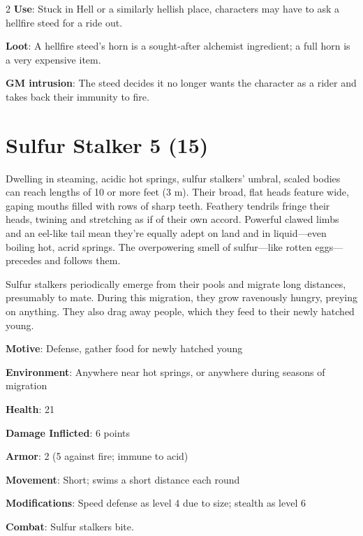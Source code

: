\begin{multicols}{2}
\textbf{Use}: Stuck in Hell or a similarly hellish place, characters may have to ask a hellfire steed for a ride out. 

\textbf{Loot}: A hellfire steed’s horn is a sought-after alchemist ingredient; a full horn is a very expensive item.

\textbf{GM intrusion}: The steed decides it no longer wants the character as a rider and takes back their immunity to fire.

\section{Sulfur Stalker 5 (15)}

Dwelling in steaming, acidic hot springs, sulfur stalkers’ umbral, scaled bodies can reach lengths of 10 or more feet (3 m). Their broad, flat heads feature wide, gaping mouths filled with rows of sharp teeth. Feathery tendrils fringe their heads, twining and stretching as if of their own accord. Powerful clawed limbs and an eel-like tail mean they’re equally adept on land and in liquid—even boiling hot, acrid springs. The overpowering smell of sulfur—like rotten eggs—precedes and follows them. 

Sulfur stalkers periodically emerge from their pools and migrate long distances, presumably to mate. During this migration, they grow ravenously hungry, preying on anything. They also drag away people, which they feed to their newly hatched young.

\textbf{Motive}: Defense, gather food for newly hatched young 

\textbf{Environment}: Anywhere near hot springs, or anywhere during seasons of migration 

\textbf{Health}: 21 

\textbf{Damage Inflicted}: 6 points 

\textbf{Armor}: 2 (5 against fire; immune to acid) 

\textbf{Movement}: Short; swims a short distance each round 

\textbf{Modifications}: Speed defense as level 4 due to size; stealth as level 6 

\textbf{Combat}: Sulfur stalkers bite. 


\end{multicols}
